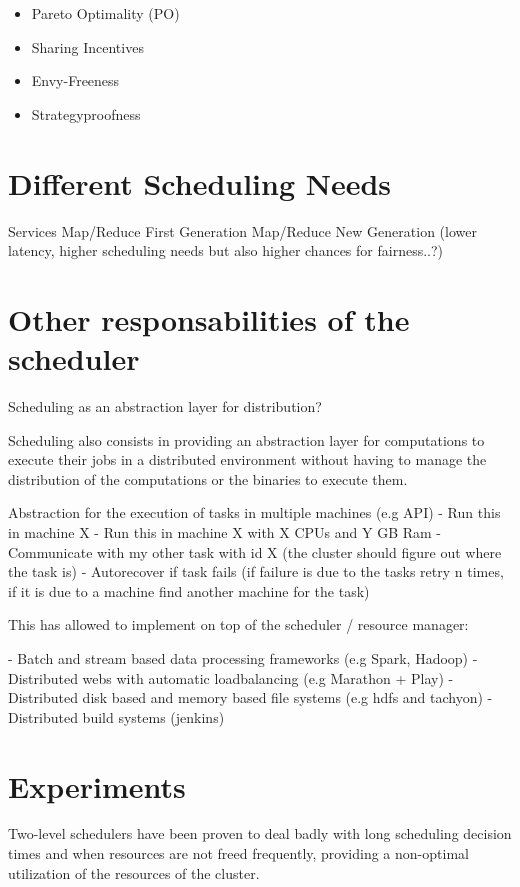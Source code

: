 \documentclass{svjour3}                     %
\begin{document}
\begin{itemize}
  \item Pareto Optimality (PO)
  \item Sharing Incentives 
  \item Envy-Freeness
  \item Strategyproofness
\end{itemize}

\section{Different Scheduling Needs}

Services
Map/Reduce First Generation
Map/Reduce New Generation (lower latency, higher scheduling needs but also higher
chances for fairness..?)


\section{Other responsabilities of the scheduler}

Scheduling as an abstraction layer for distribution?

Scheduling also consists in providing an abstraction layer for
computations to execute their jobs in a distributed environment
without having to manage the distribution of the computations
or the binaries to execute them.

Abstraction for the execution of tasks in multiple machines (e.g API)
  - Run this in machine X
  - Run this in machine X with X CPUs and Y GB Ram
  - Communicate with my other task with id X (the cluster should figure out where the task is)
  - Autorecover if task fails (if failure is due to the tasks retry n times, if it is due
    to a machine find another machine for the task)
    
This has allowed to implement on top of the scheduler / resource manager:

  - Batch and stream based data processing frameworks (e.g Spark, Hadoop)
  - Distributed webs with automatic loadbalancing (e.g Marathon + Play)
  - Distributed disk based and memory based file systems (e.g hdfs and tachyon)
  - Distributed build systems (jenkins)

\section{Experiments}
Two-level schedulers have been proven to deal badly with long scheduling decision times and
when resources are not freed frequently, providing a non-optimal utilization of the resources
of the cluster.
\end{document}
